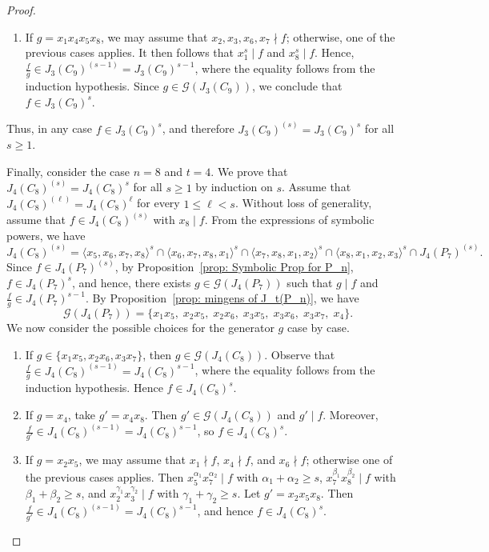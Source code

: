 \documentclass[10pt,a4paper]{amsart}
\def\l{\langle}
\def\r{\rangle}
\begin{document}
\begin{proof}
\begin{enumerate}
\item If $g=x_1x_4x_5x_8$, we may assume that $x_2,x_3, x_6,x_7\nmid f$; otherwise, one of the previous cases applies. It then follows that $x_1^s\mid f$ and $x_8^s\mid f$. Hence, $\frac{f}{g}\in J_3(C_9)^{(s-1)}=J_3(C_9)^{s-1}$, where the equality follows from the induction hypothesis.
Since $g\in \mathcal{G}(J_3(C_9))$, we conclude that
$f\in J_3(C_9)^s$.

\end{enumerate}
Thus, in any case $f\in J_3(C_9)^s$, and therefore $J_3(C_9)^{(s)} = J_3(C_9)^s$ for all $s\ge1$.

Finally, consider the case $n=8$ and $t=4$. We prove that
$J_4(C_8)^{(s)} = J_4(C_8)^s$ for all $s \ge 1$ by induction on $s$. Assume that $J_4(C_8)^{(\ell)} = J_4(C_8)^{\ell}$ for every $1\le \ell < s$. Without loss of generality, assume that $f \in J_4(C_8)^{(s)}$ with $x_8 \mid f$. From the expressions of symbolic powers, we have
\[
J_4(C_8)^{(s)}= \l x_5,x_6,x_7,x_8\r ^s
\cap \l x_6,x_7,x_8,x_1\r ^s
\cap \l x_7,x_8,x_1,x_2\r ^s
\cap \l x_8,x_1,x_2,x_3\r ^s
\cap J_4(P_7)^{(s)}.
\]
Since $f \in J_4(P_7)^{(s)}$, by Proposition~\ref{prop: Symbolic Prop for P_n}, $f \in J_4(P_7)^{s}$, and hence, there exists $g \in \mathcal{G}(J_4(P_7))$ such that $g \mid f$ and $\frac{f}{g} \in J_4(P_7)^{s-1}$. By Proposition~\ref{prop: mingens of J_t(P_n)}, we have 
\[
\mathcal{G}(J_4(P_7))=\{x_1x_5,\; x_2x_5,\; x_2x_6,\; x_3x_5,\; x_3x_6,\; x_3x_7,\; x_4\}.
\]
We now consider the possible choices for the generator $g$ case by case.
\begin{enumerate}


\item If $g \in \{x_1x_5, x_2x_6, x_3x_7\}$, then
$g \in \mathcal{G}(J_4(C_8))$. Observe that $\frac{f}{g} \in J_4(C_8)^{(s-1)} = J_4(C_8)^{s-1}$, where the equality follows from the induction hypothesis. Hence $f \in J_4(C_8)^s$.

\item If $g = x_4$, take $g' = x_4x_8$.
Then $g' \in \mathcal{G}(J_4(C_8))$ and $g' \mid f$.
Moreover, $\frac{f}{g'} \in J_4(C_8)^{(s-1)} = J_4(C_8)^{s-1}$,
so $f \in J_4(C_8)^s$.

\item If $g = x_2x_5$, we may assume that
$x_1 \nmid f$, $x_4 \nmid f$, and $x_6 \nmid f$;
otherwise one of the previous cases applies.
Then $x_5^{\alpha_1}x_7^{\alpha_2} \mid f$ with $\alpha_1+\alpha_2 \ge s$,
$x_7^{\beta_1}x_8^{\beta_2} \mid f$ with $\beta_1+\beta_2 \ge s$,
and $x_2^{\gamma_1}x_3^{\gamma_2} \mid f$ with $\gamma_1+\gamma_2 \ge s$.
Let $g' = x_2x_5x_8$. Then
$\frac{f}{g'} \in J_4(C_8)^{(s-1)} = J_4(C_8)^{s-1}$,
and hence $f \in J_4(C_8)^s$.


\end{enumerate}
\end{proof}
\end{document}
